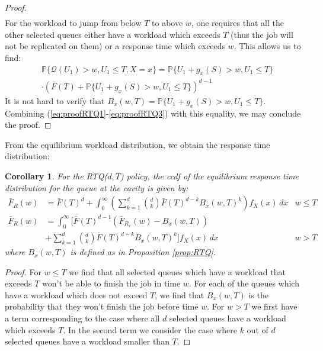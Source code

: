 \documentclass[12pt]{report}
\renewcommand{\P}{\mathbb{P}}
\newcommand{\QQ}{\mathcal{Q}}
\renewcommand{\P}{\mathbb{P}}
\newtheorem{corollary}[theorem]{Corollary}
\begin{document}
\begin{proof}
\begin{align}
\end{align}
For the workload to jump from below $T$ to above $w$, one requires that all the other selected queues either have a workload which exceeds $T$ (thus the job will not be replicated on them) or a response time which exceeds $w$. This allows us to find:
\begin{align}
&\P\{\QQ(U_1) > w, U_1 \leq T, X=x\}= \P\{U_1+g_x(S) > w, U_1 \leq T\}\nonumber\\
& \cdot (\bar F(T) + \P\{U_1+g_x(S) > w, U_1 \leq T\})^{d-1} \label{eq:proofRTQ3}
\end{align}
It is not hard to verify that $B_x(w,T)=\P\{U_1+g_x(S) > w, U_1 \leq T\}$. Combining (\ref{eq:proofRTQ1}-\ref{eq:proofRTQ3}) with this equality, we may conclude the proof.
\end{proof}
From the equilibrium workload distribution, we obtain the response time distribution:
\begin{corollary}\label{cor:RTQ_resp}
For the RTQ($d,T$) policy, the ccdf of the equilibrium response time distribution for the queue at the cavity is given by:
\begin{align*}
\bar F_R(w)
&= \bar F(T)^d + \int_0^\infty \left( \sum_{k=1}^d \binom{d}{k} \bar F(T)^{d-k} B_x(w,T)^k\right) f_X(x) \, dx & w \leq T\\
\bar F_R(w)
&= \int_0^\infty \bigg[ \bar F(T)^{d-1} (\bar F_{R_x}(w) - B_x(w,T))\\
& + \sum_{k=1}^d \binom{d}{k} \bar F(T)^{d-k} B_x(w,T)^k \bigg] f_X(x) \, dx & w >T
\end{align*}
where $B_x(w,T)$ is defined as in Proposition \ref{prop:RTQ}.
\end{corollary}
\begin{proof}
For $w \leq T$ we find that all selected queues which have a workload that exceeds $T$ won't be able to finish the job in time $w$. For each of the queues which have a workload which does not exceed $T$, we find that $B_x(w,T)$ is the probability that they won't finish the job before time $w$. For $w>T$ we first have a term corresponding to the case where all $d$ selected queues have a workload which exceeds $T$. In the second term we consider the case where $k$ out of $d$ selected queues have a workload smaller than $T$.
\end{proof}
\end{document}
